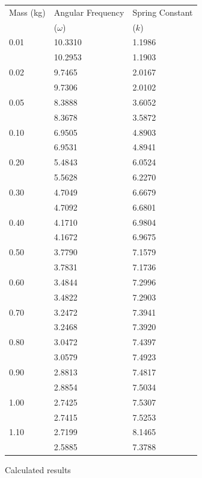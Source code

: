 \documentclass{article}
\numberwithin{figure}{section}
\numberwithin{table}{section}
\begin{document}
\begin{figure}[!hbp] 
    \centering
    \begin{tabular}{lll} 
            \toprule
            Mass (kg) & Angular Frequency & Spring Constant \\
                        & ($\omega$) & ($k$) \\ 
            \midrule 
            0.01 & 10.3310 & 1.1986 \\ 
            & 10.2953 & 1.1903 \\
            0.02 & 9.7465 & 2.0167 \\ 
            & 9.7306 & 2.0102 \\
            0.05 & 8.3888 & 3.6052 \\ 
            & 8.3678 & 3.5872 \\
            0.10 & 6.9505 & 4.8903 \\ 
            & 6.9531 & 4.8941 \\
            0.20 & 5.4843 & 6.0524 \\ 
            & 5.5628 & 6.2270 \\
            0.30 & 4.7049 & 6.6679 \\ 
            & 4.7092 & 6.6801 \\
            0.40 & 4.1710 & 6.9804 \\ 
            & 4.1672 & 6.9675 \\
            0.50 & 3.7790 & 7.1579 \\ 
            & 3.7831 & 7.1736 \\
            0.60 & 3.4844 & 7.2996 \\ 
            & 3.4822 & 7.2903 \\
            0.70 & 3.2472 & 7.3941 \\ 
            & 3.2468 & 7.3920 \\
            0.80 & 3.0472 & 7.4397 \\ 
            & 3.0579 & 7.4923 \\
            0.90 & 2.8813 & 7.4817 \\ 
            & 2.8854 & 7.5034 \\
            1.00 & 2.7425 & 7.5307 \\ 
            & 2.7415 & 7.5253 \\
            1.10 & 2.7199 & 8.1465 \\ 
            & 2.5885 & 7.3788 \\
            \bottomrule
    \end{tabular} 
    \caption{Calculated results} 
    \label{results} 
\end{figure}
\end{document}
